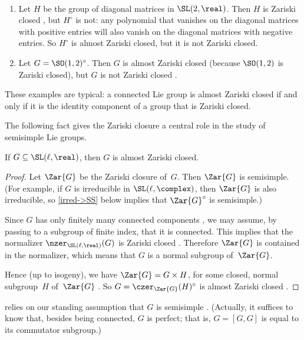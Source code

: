 \begin{egs} \ 
\noprelistbreak
 \begin{enumerate}
 \item Let $H$ be the group of diagonal matrices in
$\SL(2,\real)$. Then $H$ is Zariski closed
, but $H^\circ$ is not: any
polynomial that vanishes on the diagonal matrices with
positive entries will also vanish on the diagonal matrices
with negative entries. So $H^\circ$ is almost Zariski closed,
but it is not Zariski closed.

\item Let $G = \SO(1,2)^\circ$. Then $G$ is almost Zariski
closed (because $\SO(1,2)$ is Zariski closed), but $G$ is
not Zariski closed .
 \end{enumerate}
 These examples are typical: a connected Lie group is almost Zariski closed if
and only if it is the identity component of a group that is Zariski closed.
 \end{egs}

The following fact gives the Zariski closure a central role
in the study of semisimple Lie groups.

\begin{thm} \label{GisAlgic}
 If $G \subseteq \SL(\ell,\real)$, then $G$ is almost Zariski closed.
 \end{thm}

\begin{proof}
 Let $\Zar{G}$ be the Zariski closure of~$G$. Then
$\Zar{G}$ is semisimple. (For example, if $G$ is
irreducible in $\SL(\ell,\complex)$, then $\Zar{G}$
is also irreducible, so \cref{irred->SS} below implies that
$\Zar{G}^\circ$ is semisimple.)

Since $G$ has only finitely many connected components , we may assume, by passing to a subgroup of finite index, that it is connected. This implies that the normalizer $\nzer_{\SL(\ell,\real)}(G)$
is Zariski closed \csee{N(G)ZarClosed}. Therefore
$\Zar{G}$ is contained in the normalizer, which means that $G$ is a normal subgroup
of~$\Zar{G}$. 

Hence (up to isogeny), we have
$\Zar{G} = G \times H$, for some closed, normal
subgroup~$H$ of~$\Zar{G}$ . 
So $G = \czer_{\Zar{G}}(H)^\circ$ is almost Zariski closed
.
 \end{proof}

\begin{warn}
  relies on our standing
assumption that $G$ is semisimple .
(Actually, it suffices to know that, besides being
connected, $G$ is perfect; that is, $G = [G,G]$ is equal to
its commutator subgroup.)
 \end{warn}

